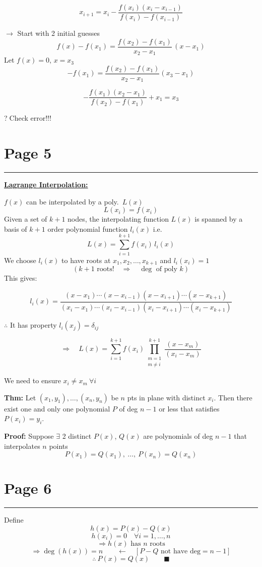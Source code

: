 \documentclass[11pt,a4paper]{article}
\newcommand{\pagehead}[1]{%
  \clearpage
  \section*{Page #1}
  \vspace{-0.6em}
  {\color{black!45}\rule{\linewidth}{0.5pt}}
  \vspace{0.4em}
}
\newcommand{\circled}[1]{\textcircled{\scriptsize #1}}
\begin{document}
\begin{handbox}
\[
x_{i+1}=x_i-\frac{f(x_i)(x_i-x_{i-1})}{f(x_i)-f(x_{i-1})}
\]
\end{handbox}
$\to$ Start with 2 initial guesses
\[
f(x)-f(x_1)=\frac{f(x_2)-f(x_1)}{x_2-x_1}\,(x-x_1)
\]
Let $f(x)=0$, $x=x_3$
\[
-f(x_1)=\frac{f(x_2)-f(x_1)}{x_2-x_1}(x_3-x_1)
\]
\begin{handbox}
\[
-\frac{f(x_1)(x_2-x_1)}{f(x_2)-f(x_1)}+x_1=x_3
\]
\end{handbox}
\quad\circled{?}\quad Check error!!!

\pagehead{5}

\textbf{\underline{Lagrange Interpolation:}}

$f(x)$ can be interpolated by a poly.\ $L(x)$
\[
L(x_i)=f(x_i)
\]
Given a set of $k+1$ nodes, the interpolating function $L(x)$ is spanned by a
basis of $k+1$ order polynomial function $l_i(x)$ i.e.
\[
L(x)=\sum_{i=1}^{k+1} f(x_i)\,l_i(x)
\]
We choose $l_i(x)$ to have roots at $x_1,x_2,\dots,x_{k+1}$ and
$l_i(x_i)=1$
\[
(k+1\text{ roots!}\quad\Rightarrow\quad \deg\text{ of poly }k)
\]
This gives:
\begin{handbox}
\[
l_i(x)=\frac{(x-x_1)\cdots(x-x_{i-1})(x-x_{i+1})\cdots(x-x_{k+1})}
{(x_i-x_1)\cdots(x_i-x_{i-1})(x_i-x_{i+1})\cdots(x_i-x_{k+1})}
\]
\end{handbox}
$\therefore$ It has property \quad $l_i(x_j)=\delta_{ij}$
\begin{handbox}
\[
\Rightarrow\quad L(x)=\sum_{i=1}^{k+1} f(x_i)
\prod_{\substack{m=1\\ m\neq i}}^{k+1}\frac{(x-x_m)}{(x_i-x_m)}
\]
\end{handbox}
We need to ensure $x_i\neq x_m\ \forall i$

\textbf{Thm:} Let $(x_1,y_1),\dots,(x_n,y_n)$ be $n$ pts in plane with
distinct $x_i$. Then there exist one and only one polynomial $P$ of deg
$n-1$ or less that satisfies $P(x_i)=y_i$.

\textbf{Proof:} Suppose $\exists$ 2 distinct $P(x)$, $Q(x)$ are polynomials of
deg $n-1$ that interpolates $n$ points
\[
P(x_1)=Q(x_1),\ \dots,\ P(x_n)=Q(x_n)
\]

\pagehead{6}

Define
\[
h(x)=P(x)-Q(x)
\]
\[
h(x_i)=0\quad \forall i=1,\dots,n
\]
\[
\Rightarrow h(x)\text{ has }n\text{ roots}
\]
\[
\Rightarrow \deg(h(x))=n
\qquad\leftarrow\quad [P-Q\text{ not have deg}=n-1]
\]
\[
\therefore\ P(x)=Q(x)\qquad\blacksquare
\]
\end{document}
